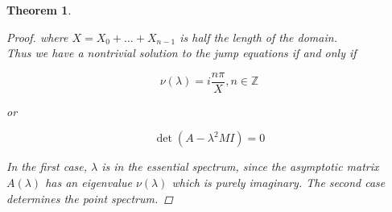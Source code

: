 \documentclass[12pt]{article}
\def\Z{{\mathbb Z}}
\newtheorem{theorem}{Theorem}
\begin{document}
\begin{theorem}
\begin{proof}
where $X = X_0 + \dots + X_{n-1}$ is half the length of the domain. \\

Thus we have a nontrivial solution to the jump equations if and only if 

\[
\nu(\lambda) = i \frac{n \pi}{X}, n \in \Z
\]

or 

\[
\det(A - \lambda^2 MI) = 0
\]

In the first case, $\lambda$ is in the essential spectrum, since the asymptotic matrix $A(\lambda)$ has an eigenvalue $\nu(\lambda)$ which is purely imaginary. The second case determines the point spectrum.

\end{proof}
\end{theorem}
\end{document}
